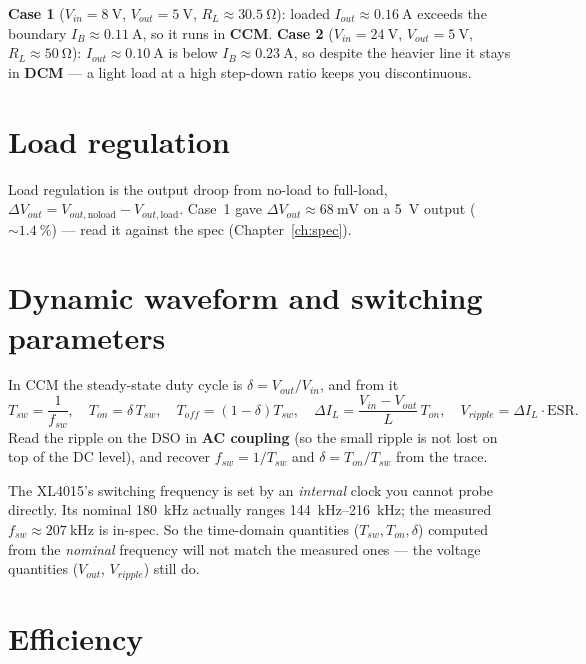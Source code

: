 \documentclass[11pt,a4paper,oneside]{book}
\begin{document}
\begin{wexample}
\textbf{Case 1} ($V_{in}=\qty{8}{\volt}$, $V_{out}=\qty{5}{\volt}$, $R_L\approx
\qty{30.5}{\ohm}$): loaded $I_{out}\approx\qty{0.16}{\ampere}$ exceeds the boundary
$I_{B}\approx\qty{0.11}{\ampere}$, so it runs in \textbf{CCM}. \textbf{Case 2}
($V_{in}=\qty{24}{\volt}$, $V_{out}=\qty{5}{\volt}$, $R_L\approx\qty{50}{\ohm}$):
$I_{out}\approx\qty{0.10}{\ampere}$ is below $I_{B}\approx\qty{0.23}{\ampere}$,
so despite the heavier line it stays in \textbf{DCM} --- a light load at a high
step-down ratio keeps you discontinuous.
\end{wexample}

\section{Load regulation}

Load regulation is the output droop from no-load to full-load,
$\Delta V_{out}=V_{out,\text{noload}}-V_{out,\text{load}}$. Case~1 gave
$\Delta V_{out}\approx\qty{68}{\milli\volt}$ on a \qty{5}{\volt} output
($\sim\qty{1.4}{\percent}$) --- read it against the spec
(Chapter~\ref{ch:spec}).

\section{Dynamic waveform and switching parameters}

In CCM the steady-state duty cycle is $\delta=V_{out}/V_{in}$, and from it
\[
T_{sw}=\frac1{f_{sw}},\quad T_{on}=\delta\,T_{sw},\quad
T_{off}=(1-\delta)T_{sw},\quad
\Delta I_L=\frac{V_{in}-V_{out}}{L}\,T_{on},\quad
V_{ripple}=\Delta I_L\cdot \mathrm{ESR}.
\]
Read the ripple on the DSO in \textbf{AC coupling} (so the small ripple is not lost
on top of the DC level), and recover $f_{sw}=1/T_{sw}$ and $\delta=T_{on}/T_{sw}$
from the trace.

\begin{warning}
The XL4015's switching frequency is set by an \emph{internal} clock you cannot
probe directly. Its nominal \qty{180}{\kilo\hertz} actually ranges
\qtyrange{144}{216}{\kilo\hertz}; the measured $f_{sw}\approx\qty{207}{\kilo\hertz}$
is in-spec. So the time-domain quantities ($T_{sw},T_{on},\delta$) computed from
the \emph{nominal} frequency will not match the measured ones --- the voltage
quantities ($V_{out}$, $V_{ripple}$) still do.
\end{warning}

\section{Efficiency}
\end{document}
